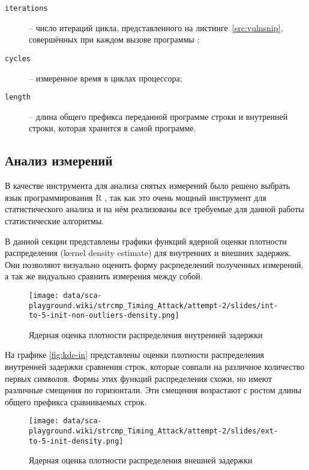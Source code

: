 \begin{description}
\item [\texttt{iterations}] -- число итераций цикла, представленного на
  листинге~\ref{src:vulnsnip}, совершённых при каждом вызове программы ;
\item [\texttt{cycles}] -- измеренное время в циклах процессора;
\item [\texttt{length}] -- длина общего префикса переданной программе  строки и
  внутренней строки, которая хранится в самой программе.
\end{description}

\subsection{Анализ измерений}

В качестве инструмента для анализа снятых измерений было решено выбрать язык программирования
R \cite{r}, так как это очень мощный инструмент для статистического анализа и на нём реализованы
все требуемые для данной работы статистические алгоритмы.

В данной секции представлены графики функций ядерной оценки плотности
распределения (kernel density estimate) для внутренних и внешних задержек.
Они позволяют визуально оценить форму расрпеделений полученных измерений, а так же
видуально сравнить измерения между собой.

\begin{figure}
    \centering
    \texttt{[image: data/sca-playground.wiki/strcmp\_Timing\_Attack/attempt-2/slides/int-to-5-init-non-outliers-density.png]}
    \caption{Ядерная оценка плотности распределения внутренней задержки}
\end{figure} \label{fig:kde-in}

На графике \ref{fig:kde-in} представлены оценки плотности распределения
внутренней задержки сравнения строк, которые совпали на различное количество
первых символов. Формы этих функций распределения схожи, но имеют различные
смещения по горизонтали. Эти смещения возрастают с ростом длины общего префикса
сравниваемых строк.

\begin{figure}
    \centering
    \texttt{[image: data/sca-playground.wiki/strcmp\_Timing\_Attack/attempt-2/slides/ext-to-5-init-density.png]}
    \caption{Ядерная оценка плотности распределения внешней задержки}
\end{figure} \label{fig:kde-out}

